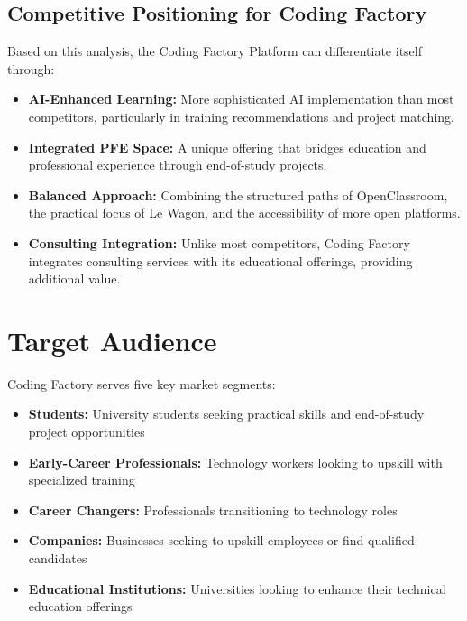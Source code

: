 \documentclass[12pt,a4paper]{report}
\begin{document}
\subsection{Competitive Positioning for Coding Factory}
Based on this analysis, the Coding Factory Platform can differentiate itself through:

\begin{itemize}
    \item \textbf{AI-Enhanced Learning:} More sophisticated AI implementation than most competitors, particularly in training recommendations and project matching.

    \item \textbf{Integrated PFE Space:} A unique offering that bridges education and professional experience through end-of-study projects.

    \item \textbf{Balanced Approach:} Combining the structured paths of OpenClassroom, the practical focus of Le Wagon, and the accessibility of more open platforms.

    \item \textbf{Consulting Integration:} Unlike most competitors, Coding Factory integrates consulting services with its educational offerings, providing additional value.
\end{itemize}

\section{Target Audience}
Coding Factory serves five key market segments:

\begin{itemize}
    \item \textbf{Students:} University students seeking practical skills and end-of-study project opportunities

    \item \textbf{Early-Career Professionals:} Technology workers looking to upskill with specialized training

    \item \textbf{Career Changers:} Professionals transitioning to technology roles

    \item \textbf{Companies:} Businesses seeking to upskill employees or find qualified candidates

    \item \textbf{Educational Institutions:} Universities looking to enhance their technical education offerings
\end{itemize}
\end{document}
